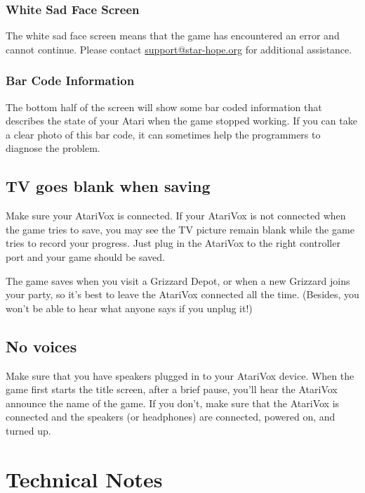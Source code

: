 \documentclass[12pt,twoside]{memoir}
\begin{document}
\begin{description}
\subsection{White Sad Face Screen}

The white sad  face screen means that the game  has encountered an error and
cannot continue.  Please contact
\href{mailto:support@star-hope.org}{support@star-hope.org} for additional
assistance.

\subsection{Bar Code Information}

The bottom half of the screen will show some bar coded information
that describes the state of your Atari when the game stopped
working. If you can take a clear photo of this bar code, it can
sometimes help the programmers to diagnose the problem.

\section{TV goes blank when saving}

Make sure your AtariVox is connected. If your AtariVox is not
connected when the game tries to save, you may see the TV picture
remain blank while the game tries to record your progress. Just plug
in the AtariVox to the right controller port and your game should be
saved.

The game saves when  you visit a Grizzard Depot, or  when a new Grizzard
joins your party,  so it's best to leave the  AtariVox connected all the
time.  (Besides, you  won't be  able  to hear  what anyone  says if  you
unplug it!)

\section{No voices}

Make sure  that you have  speakers plugged  in to your  AtariVox device.
When the game first starts the title screen, after a brief pause, you'll
hear the AtariVox announce the name of the game. If you don't, make sure
that  the AtariVox  is connected  and the  speakers (or  headphones) are
connected, powered on, and turned up.

\chapter{Technical Notes}


\end{description}
\end{document}
